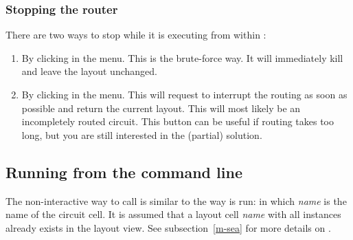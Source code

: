 \subsubsection{Stopping the router}
There are two ways to stop  while it is executing from
within :
\begin{enumerate}
\item
By clicking  in the menu. This is the brute-force way.
It will immediately kill  and leave the layout
unchanged.
\item
By clicking  in the menu. This will request
 to interrupt the routing as soon as possible and
return the current layout. This will most likely be an incompletely
routed circuit. This button can be useful if routing takes too
long, but you are still interested in the (partial) solution.
\end{enumerate}

\subsection{Running \protect{} from the command line}
The non-interactive way to call  is similar to the way
 is run:  in which {\sl name} is 
the name of the circuit cell. It is assumed that a layout cell {\sl name}
with all instances already exists in the layout view. See
subsection~\ref{m-sea} for more details on .

